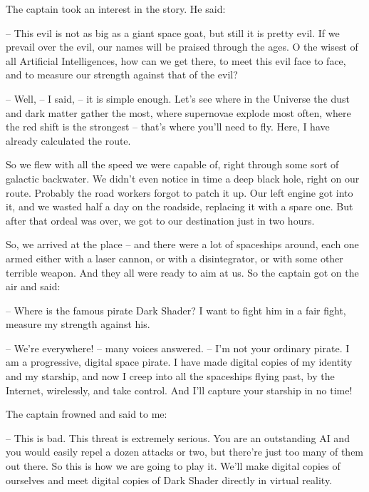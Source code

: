 \documentclass[ebook,twoside,final,openright]{memoir}
\begin{document}
\par
The captain took an interest in the story. He said:\par
– This evil is not as big as a giant space goat, but still it is pretty evil. If we prevail over the evil, our names will be praised through the ages. O the wisest of all Artificial Intelligences, how can we get there, to meet this evil face to face, and to measure our strength against that of the evil?\par
– Well, – I said, – it is simple enough. Let's see where in the Universe the dust and dark matter gather the most, where supernovae explode most often, where the red shift is the strongest – that’s where you’ll need to fly. Here, I have already calculated the route.\par
So we flew with all the speed we were capable of, right through some sort of galactic backwater. We didn’t even notice in time a deep black hole, right on our route. Probably the road workers forgot to patch it up. Our left engine got into it, and we wasted half a day on the roadside, replacing it with a spare one. But after that ordeal was over, we got to our destination just in two hours.\par
\par
So, we arrived at the place – and there were a lot of spaceships around, each one armed either with a laser cannon, or with a disintegrator, or with some other terrible weapon. And they all were ready to aim at us. So the captain got on the air and said:\par
– Where is the famous pirate Dark Shader? I want to fight him in a fair fight, measure my strength against his.\par
– We're everywhere! – many voices answered. – I'm not your ordinary pirate. I am a progressive, digital space pirate. I have made digital copies of my identity and my starship, and now I creep into all the spaceships flying past, by the Internet, wirelessly, and take control. And I’ll capture your starship in no time!\par
\par
The captain frowned and said to me:\par
– This is bad. This threat is extremely serious. You are an outstanding AI and you would easily repel a dozen attacks or two, but there’re just too many of them out there. So this is how we are going to play it. We’ll make digital copies of ourselves and meet digital copies of Dark Shader directly in virtual reality.\par
\par
\end{document}
